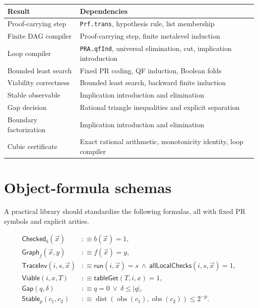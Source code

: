 \documentclass[11pt]{article}
\newcommand{\dist}{\mathop{\mathrm{dist}}}
\newcommand{\obs}{\mathop{\mathrm{obs}}}
\begin{document}
\begin{center}
\begin{tabular}{p{}p{}}
\toprule
Result & Dependencies \\
\midrule
Proof-carrying step & \texttt{Prf.trans}, hypothesis rule, list membership \\
Finite DAG compiler & Proof-carrying step, finite metalevel induction \\
Loop compiler & \texttt{PRA.qfInd}, universal elimination, cut, implication introduction \\
Bounded least search & Fixed PR coding, QF induction, Boolean folds \\
Viability correctness & Bounded least search, backward finite induction \\
Stable observable & Implication introduction and elimination \\
Gap decision & Rational triangle inequalities and explicit separation \\
Boundary factorization & Implication introduction and elimination \\
Cubic certificate & Exact rational arithmetic, monotonicity identity, loop compiler \\
\bottomrule
\end{tabular}
\end{center}

\section{Object-formula schemas}

A practical library should standardize the following formulas, all with fixed
PR symbols and explicit arities.

\begin{align*}
  \mathsf{Checked}_b(\vec x)
    &:\equiv b(\vec x)=1,\\
  \mathsf{Graph}_f(\vec x,y)
    &:\equiv f(\vec x)=y,\\
  \mathsf{TraceInv}(i,s,\vec x)
    &:\equiv \mathsf{run}(i,\vec x)=s\ \wedge\
      \mathsf{allLocalChecks}(i,s,\vec x)=1,\\
  \mathsf{Viable}(i,x,T)
    &:\equiv \mathsf{tableGet}(T,i,x)=1,\\
  \mathsf{Gap}(q,\delta)
    &:\equiv q=0\ \vee\ \delta\le |q|,\\
  \mathsf{Stable}_p(c_1,c_2)
    &:\equiv \dist(\obs(c_1),\obs(c_2))\le 2^{-p}.
\end{align*}
\end{document}
